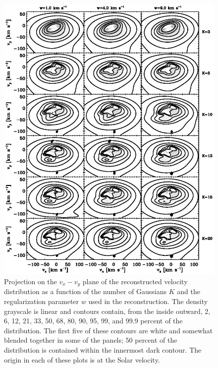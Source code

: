 \clearpage
\begin{figure}
\includegraphics{figs_veldist/veldensXY.ps}
\caption[Projection on the $v_x-v_y$ plane of the reconstructed velocity distribution as a function of the number of Gaussians $K$ and the regularization parameter $w$ used in the reconstruction.]{Projection on the $v_x-v_y$ plane of the reconstructed velocity distribution as a function of the number of Gaussians $K$ and the regularization parameter $w$ used in the reconstruction. The density grayscale is linear and contours contain, from the inside outward, 2, 6, 12, 21, 33, 50, 68, 80, 90, 95, 99, and 99.9 percent of the distribution. The first five of these contours are white and somewhat blended together in some of the panels; 50 percent of the distribution is contained within the innermost dark contour. The origin in each of these plots is at the Solar velocity.}%
\label{fig:veldensXY}
\end{figure}



